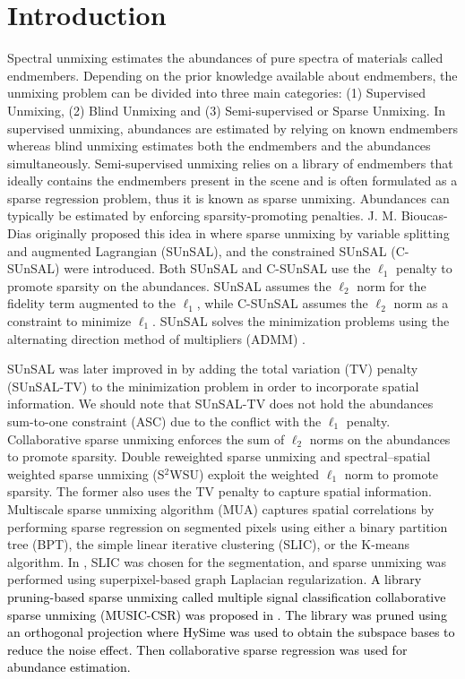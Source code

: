 \newpage
\minitoc

\section{Introduction}

Spectral unmixing estimates the abundances of pure spectra of materials called endmembers. Depending on the prior knowledge available about endmembers, the unmixing problem can be divided into three main categories: (1) Supervised Unmixing, (2) Blind Unmixing and (3) Semi-supervised or Sparse Unmixing. In supervised unmixing, abundances are estimated by relying on known endmembers whereas blind unmixing estimates both the endmembers and the abundances simultaneously. Semi-supervised unmixing relies on a library of endmembers that ideally contains the endmembers present in the scene and is often formulated as a sparse regression problem, thus it is known as sparse unmixing. Abundances can typically be estimated by enforcing sparsity-promoting penalties. J. M. Bioucas-Dias originally proposed this idea in \cite{bioucas-dias_alternating_2010} where sparse unmixing by variable splitting and augmented Lagrangian (SUnSAL), and the constrained SUnSAL (C-SUnSAL) were introduced. Both SUnSAL and C-SUnSAL use the $\ell_1$ penalty to promote sparsity on the abundances. SUnSAL assumes the $\ell_2$ norm for the fidelity term augmented to the $\ell_1$, while C-SUnSAL assumes the $\ell_2$ norm as a constraint to minimize $\ell_1$. SUnSAL solves the minimization problems using the alternating direction method of multipliers (ADMM) \cite{eckstein_douglas-rachford_1992}. 

SUnSAL was later improved in \cite{iordache_total_2012} by adding the total variation (TV) penalty (SUnSAL-TV) to the minimization problem in order to incorporate spatial information. We should note that SUnSAL-TV does not hold the abundances sum-to-one constraint (ASC) due to the conflict with the $\ell_1$ penalty. Collaborative sparse \cite{iordache_collaborative_2014} unmixing enforces the sum of $\ell_2$ norms on the abundances to promote sparsity. Double reweighted sparse unmixing \cite{wang_hyperspectral_2017} and spectral–spatial weighted sparse unmixing (S$^2$WSU) \cite{zhang_spectralspatial_2018} exploit the weighted $\ell_1$ norm to promote sparsity. The former also uses the TV penalty to capture spatial information. Multiscale sparse unmixing algorithm (MUA) \cite{borsoi_fast_2019} captures spatial correlations by performing sparse regression on segmented pixels using either a binary partition tree (BPT), the simple linear iterative clustering (SLIC), or the K-means algorithm. In \cite{ince_superpixel-based_2020}, SLIC was chosen for the segmentation, and sparse unmixing was performed using superpixel-based graph Laplacian regularization. \textcolor{black}{ A library pruning-based sparse unmixing called multiple signal classification collaborative sparse unmixing (MUSIC-CSR) was proposed in \cite{iordache_music-csr_2014}. The library was pruned using an orthogonal projection where HySime \cite{bioucas-dias_hyperspectral_2008} was used to obtain the subspace bases to reduce the noise effect. Then collaborative sparse regression was used for abundance estimation.}

